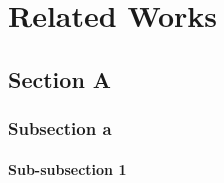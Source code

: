 
\chapter{Related Works}

\section{Section A}

\subsection{Subsection a}

\subsubsection{Sub-subsection 1}
